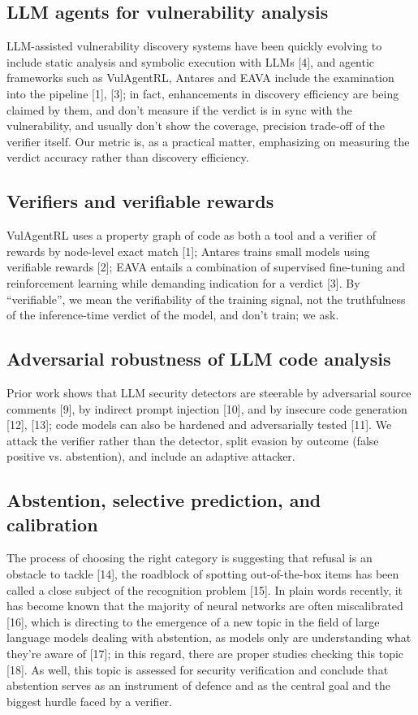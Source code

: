 \documentclass[conference]{IEEEtran}
\begin{document}
\subsection{LLM agents for vulnerability analysis}

LLM-assisted vulnerability discovery systems have been quickly evolving to include static analysis and symbolic execution with LLMs [4], and agentic frameworks such as VulAgentRL, Antares and EAVA include the examination into the pipeline [1], [3]; in fact, enhancements in discovery efficiency are being claimed by them, and don't measure if the verdict is in sync with the vulnerability, and usually don't show the coverage, precision trade-off of the verifier itself. Our metric is, as a practical matter, emphasizing on measuring the verdict accuracy rather than discovery efficiency.

\subsection{Verifiers and verifiable rewards}

VulAgentRL uses a property graph of code as both a tool and a verifier of rewards by node-level exact match [1]; Antares trains small models using verifiable rewards [2]; EAVA entails a combination of supervised fine-tuning and reinforcement learning while demanding indication for a verdict [3]. By “verifiable”, we mean the verifiability of the training signal, not the truthfulness of the inference-time verdict of the model, and don’t train; we ask.

\subsection{Adversarial robustness of LLM code analysis}

Prior work shows that LLM security detectors are steerable by adversarial source comments [9], by indirect prompt injection [10], and by insecure code generation [12], [13]; code models can also be hardened and adversarially tested [11]. We attack the verifier rather than the detector, split evasion by outcome (false positive vs. abstention), and include an adaptive attacker.

\subsection{Abstention, selective prediction, and calibration}

The process of choosing the right category is suggesting that refusal is an obstacle to tackle [14], the roadblock of spotting out-of-the-box items has been called a close subject of the recognition problem [15]. In plain words recently, it has become known that the majority of neural networks are often miscalibrated [16], which is directing to the emergence of a new topic in the field of large language models dealing with abstention, as models only are understanding what they're aware of [17]; in this regard, there are proper studies checking this topic [18]. As well, this topic is assessed for security verification and conclude that abstention serves as an instrument of defence and as the central goal and the biggest hurdle faced by a verifier.
\end{document}
